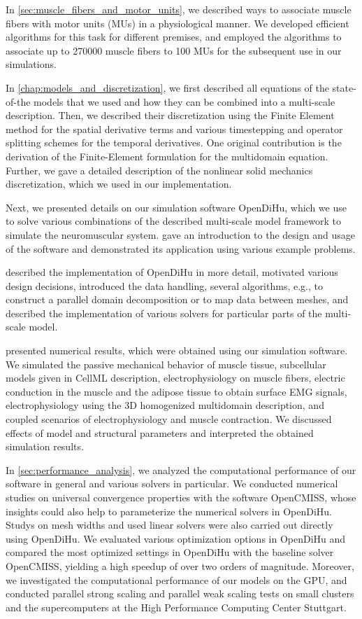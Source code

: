 In \cref{sec:muscle_fibers_and_motor_units}, we described ways to associate muscle fibers with motor units (MUs) in a physiological manner. We developed efficient algorithms for this task for different premises, and employed the algorithms to associate up to \num{270000} muscle fibers to \num{100} MUs for the subsequent use in our simulations.

In \cref{chap:models_and_discretization}, we first described all equations of the state-of-the models that we used and how they can be combined into a multi-scale description. Then, we described their discretization using the Finite Element method for the spatial derivative terms and various timestepping and operator splitting schemes for the temporal derivatives. One original contribution is the derivation of the Finite-Element formulation for the multidomain equation. Further, we gave a detailed description of the nonlinear solid mechanics discretization, which we used in our implementation.

Next, we presented details on our simulation software OpenDiHu, which we use to solve various combinations of the described multi-scale model framework to simulate the neuromuscular system.  gave an introduction to the design and usage of the software and demonstrated its application using various example problems.

 described the implementation of OpenDiHu in more detail, motivated various design decisions, introduced the data handling, several algorithms, e.g., to construct a parallel domain decomposition or to map data between meshes, and described the implementation of various solvers for particular parts of the multi-scale model.

 presented numerical results, which were obtained using our simulation software. We simulated the passive mechanical behavior of muscle tissue, subcellular models given in CellML description, electrophysiology on muscle fibers, electric conduction in the muscle and the adipose tissue to obtain surface EMG signals, electrophysiology using the 3D homogenized multidomain description, and coupled scenarios of electrophysiology and muscle contraction. We discussed effects of model and structural parameters and interpreted the obtained simulation results.

In \cref{sec:performance_analysis}, we analyzed the computational performance of our software in general and various solvers in particular. We conducted numerical studies on universal convergence properties with the software OpenCMISS, whose insights could also help to parameterize the numerical solvers in OpenDiHu. Studys on mesh widths and used linear solvers were also carried out directly using OpenDiHu. We evaluated various optimization options in OpenDiHu and compared the most optimized settings in OpenDiHu with the baseline solver OpenCMISS, yielding a high speedup of over two orders of magnitude. Moreover, we investigated the computational performance of our models on the GPU, and conducted parallel strong scaling and parallel weak scaling tests on small clusters and the supercomputers at the High Performance Computing Center Stuttgart.


